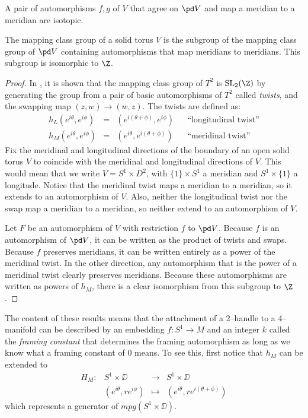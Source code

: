 \begin{lem}
	A pair of automorphisms $f,g$ of $V$ that agree on $\pd V$ and map a meridian to a meridian are isotopic.	
\end{lem}

\begin{theorem}
	The mapping class group of a solid torus $V$ is the subgroup of the mapping class group of $\pd V$ containing automorphisms that map meridians to meridians.
	This subgroup is isomorphic to $\Z$.	
\end{theorem}

\begin{proof}
	In \cite{Rolf76}, it is shown that the mapping class group of $T^2$ is $\textrm{SL}_2(\Z)$ by generating the group from a pair of basic automorphisms of $T^2$ called \emph{twists}, and the swapping map $(z,w)\to(w,z)$.
	The twists are defined as:
	\[
	\begin{array}{ccccc}
	h_L(e^{i\theta},e^{i\phi}) & = & (e^{i(\theta+\phi)},e^{i\phi}) & & \textrm{``longitudinal twist''} \\
	
	h_M(e^{i\theta},e^{i\phi}) & = & (e^{i\theta},e^{i(\theta+\phi)}) & & \textrm{``meridinal twist''}	
	\end{array}
	\]
	Fix the meridinal and longitudinal directions of the boundary of an open solid torus $V$ to coincide with the meridinal and longitudinal directions of $V$.
	This would mean that we write $V=S^1\times D^2$, with $\{1\}\times S^1$ a meridian and $S^1\times\{1\}$ a longitude.
	Notice that the meridinal twist maps a meridian to a meridian, so it extends to an automorphism of $V$.
	Also, neither the longitudinal twist nor the swap map a meridian to a meridian, so neither extend to an automorphism of $V$.
	
	Let $F$ be an automorphism of $V$ with restriction $f$ to $\pd V$.
	Because $f$ is an automorphism of $\pd V$, it can be written as the product of twists and swaps.
	Because $f$ preserves meridians, it can be written entirely as a power of the meridinal twist.
	In the other direction, any automorphism that is the power of a meridinal twist clearly preserves meridians.
	Because these automorphisms are written as powers of $h_M$, there is a clear isomorphism from this subgroup to $\Z$.
\end{proof}

The content of these results means that the attachment of a 2--handle to a 4--manifold can be described by an embedding $f:S^1\to M$ and an integer $k$ called the \emph{framing constant} that determines the framing automorphism as long as we know what a framing constant of $0$ means.
To see this, first notice that $h_M$ can be extended to
\[
\begin{array}{cccc}
H_M: & S^1\times\DD & \to & S^1\times\DD \\
& (e^{i\theta}, re^{i\phi}) & \mapsto & (e^{i\theta},re^{i(\theta+\phi)})	
\end{array}
\]
which represents a generator of $mpg(S^1\times\DD)$.


